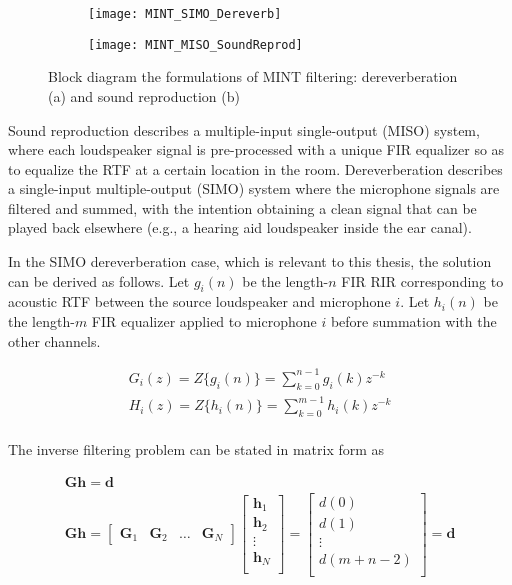 \begin{figure}[H]
	\centering
	\begin{subfigure}[b]{0.49\textwidth}
		\centering
		\texttt{[image: MINT\_SIMO\_Dereverb]}
		\subcaption{} 
	\end{subfigure}
	\hfill
	\begin{subfigure}[b]{0.49\textwidth}
		\centering
		\texttt{[image: MINT\_MISO\_SoundReprod]}
		\subcaption{} 
	\end{subfigure}
	\caption[Block diagram for the MISO and SIMO formulations of MINT filtering]{Block diagram the formulations of MINT filtering: dereverberation (a) and sound reproduction (b)}
	\label{fig:MINT_Structures}
\end{figure}

Sound reproduction describes a multiple-input single-output (MISO) system, where each loudspeaker signal is pre-processed with a unique FIR equalizer so as to equalize the RTF at a certain location in the room. Dereverberation describes a single-input multiple-output (SIMO) system where the microphone signals are filtered and summed, with the intention obtaining a clean signal that can be played back elsewhere (e.g., a hearing aid loudspeaker inside the ear canal).

In the SIMO dereverberation case, which is relevant to this thesis, the solution can be derived as follows. Let $g_i(n)$ be the length-$n$ FIR RIR corresponding to acoustic RTF between the source loudspeaker and microphone $i$. Let $h_i(n)$ be the length-$m$ FIR equalizer applied to microphone $i$ before summation with the other channels. 

\begin{eqnarray}
	G_i(z) = Z\{g_i(n)\} = \sum_{k=0}^{n-1}g_i(k)z^{-k} \\
	H_i(z) = Z\{h_i(n)\} = \sum_{k=0}^{m-1}h_i(k)z^{-k} \\
\end{eqnarray}

The inverse filtering problem can be stated in matrix form as

\begin{eqnarray}
	\boldsymbol{G} \boldsymbol{h}=\boldsymbol{d} \label{eq:MINT_problem} \\
	\boldsymbol{G} \boldsymbol{h} =
	\begin{bmatrix}
		\boldsymbol{G}_1 & \boldsymbol{G}_2 & \dots& \boldsymbol{G}_N
	\end{bmatrix} 
	\begin{bmatrix}
		\boldsymbol{h}_1 \\
		\boldsymbol{h}_2 \\
		\vdots \\
		\boldsymbol{h}_N \\
	\end{bmatrix}
	=
	\begin{bmatrix}
		d(0) \\
		d(1) \\
		\vdots \\
		d(m+n-2) \\
	\end{bmatrix} 
	=
	\boldsymbol{d}
\end{eqnarray}

